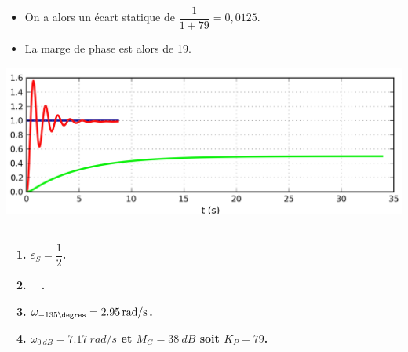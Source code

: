 \documentclass[10pt,fleqn]{article} %
\begin{document}
\begin{multicols}{2}
\begin{corrige}
\begin{itemize}
\item On a alors un écart statique de $\dfrac{1}{1+79}=0,0125$.

\item La marge de phase est alors de 19\degres. 
\end{itemize}

\begin{center}
\includegraphics[width=.9\linewidth]{images/01_03}
\end{center}

\end{corrige}
\else
\fi



\ifprof
\else
\noindent
\begin{tabular}{|p{.9\linewidth}|}
\hline
\begin{enumerate}
\item $\varepsilon_S=\dfrac{1}{2}$.
\item $\quad$.
\item $\omega_{-135\degres}=\SI{2,95}{rad/s}$.
\item $\omega_{\SI{0}{dB}}=\SI{7,17}{rad/s}$ et $M_G=\SI{38}{dB}$ soit $K_P=79$.
\end{enumerate} \\
\hline
\end{tabular}
\fi




\ifprof
\else
\begin{center}
\end{center}
\fi



\end{multicols}
\end{document}

